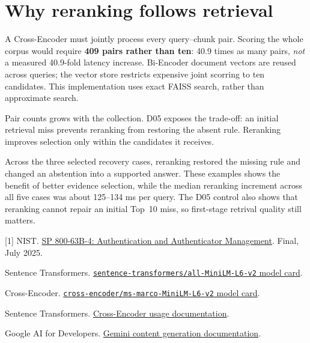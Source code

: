 \documentclass[11pt,a4paper]{article}
\newcommand{\smallhead}[1]{\par\addvspace{15pt}\Needspace{5\baselineskip}{\sffamily\bfseries\fontsize{11.5}{15}\selectfont\color{accent}#1}\par\nobreak\vspace{4pt}}
\begin{document}
\section{Why reranking follows retrieval}\label{sec:scaling}
A Cross-Encoder must jointly process every query--chunk pair. Scoring the whole corpus would require \textbf{409 pairs rather than ten}: 40.9 times as many pairs, \emph{not} a measured 40.9-fold latency increase. Bi-Encoder document vectors are reused across queries; the vector store restricts expensive joint scorring to ten candidates. This implementation uses exact FAISS search, rather than approximate search.

Pair counts grows with the collection. D05 exposes the trade-off: an initial retrieval miss prevents reranking from restoring the absent rule. Reranking improves selection only within the candidates it receives.
\smallhead{Overall takeaway}
Across the three selected recovery cases, reranking restored the missing rule and changed an abstention into a supported answer. These examples shows the benefit of better evidence selection, while the median reranking increment across all five cases was about 125--134 ms per query. The D05 control also shows that reranking cannot repair an initial Top~10 miss, so first-stage retrival quality still matters.
\smallhead{References}
{\fontsize{10}{14}\selectfont
\setlength{\parskip}{5pt}
[1] NIST. \href{https://csrc.nist.gov/pubs/sp/800/63/b/4/final}{SP 800-63B-4: Authentication and Authenticator Management}. Final, July 2025.\par
[2] Sentence Transformers. \href{https://huggingface.co/sentence-transformers/all-MiniLM-L6-v2}{\texttt{sentence-transformers/all-MiniLM-L6-v2} model card}.\par
[3] Cross-Encoder. \href{https://huggingface.co/cross-encoder/ms-marco-MiniLM-L6-v2}{\texttt{cross-encoder/ms-marco-MiniLM-L6-v2} model card}.\par
[4] Sentence Transformers. \href{https://www.sbert.net/docs/cross_encoder/usage/usage.html}{Cross-Encoder usage documentation}.\par
[5] Google AI for Developers. \href{https://ai.google.dev/gemini-api/docs/generate-content}{Gemini content generation documentation}.\par
}
\end{document}
